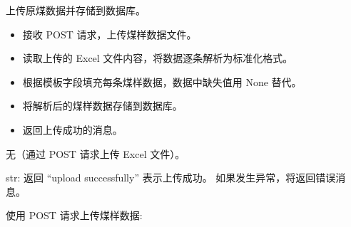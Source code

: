 \documentclass[a4paper,12pt,english]{sphinxmanual}
\begin{document}
\begin{fulllineitems}
\label{\detokenize{api/login:login.uploadCoalData}}
\pysigstartsignatures
{}
\pysigstopsignatures
\sphinxAtStartPar
上传原煤数据并存储到数据库。
\begin{description}
\begin{itemize}
\item {} 
\sphinxAtStartPar
接收 POST 请求，上传煤样数据文件。

\item {} 
\sphinxAtStartPar
读取上传的 Excel 文件内容，将数据逐条解析为标准化格式。

\item {} 
\sphinxAtStartPar
根据模板字段填充每条煤样数据，数据中缺失值用 None 替代。

\item {} 
\sphinxAtStartPar
将解析后的煤样数据存储到数据库。

\item {} 
\sphinxAtStartPar
返回上传成功的消息。

\end{itemize}

\sphinxAtStartPar
无（通过 POST 请求上传 Excel 文件）。

\sphinxAtStartPar
str: 返回 “upload successfully” 表示上传成功。
如果发生异常，将返回错误消息。

\sphinxAtStartPar
使用 POST 请求上传煤样数据:

\begin{sphinxVerbatim}[commandchars=\\\{\}]
 
 


\end{sphinxVerbatim}
\end{description}
\end{fulllineitems}
\end{document}
